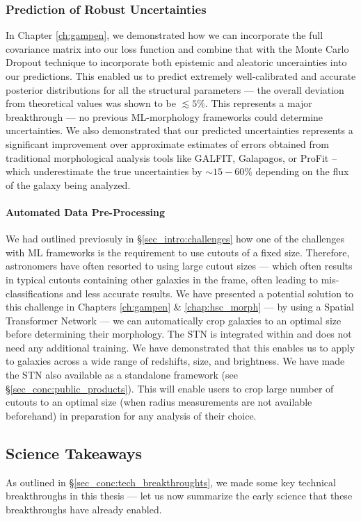 \subsubsection{Prediction of Robust Uncertainties}
In Chapter \ref{ch:gampen}, we demonstrated how we can incorporate the full covariance matrix into our loss function and combine that with the Monte Carlo Dropout technique to incorporate both epistemic and aleatoric uncerainties into our predictions. This enabled us to predict extremely well-calibrated and accurate posterior distributions for all the structural parameters --- the overall deviation from theoretical values was shown to be $\lesssim 5\%$. This represents a major breakthrough --- no previous ML-morphology frameworks could determine uncertainties. We also demonstrated that our predicted uncertainties represents a significant improvement over approximate estimates of errors obtained from traditional morphological analysis tools like GALFIT, Galapagos, or ProFit -- which underestimate the true uncertainties by $\sim15-60\%$ depending on the flux of the galaxy being analyzed. 


\paragraph{Automated Data Pre-Processing} We had outlined previosuly in \S \ref{sec_intro:challenges} how one of the challenges with ML frameworks is the requirement to use cutouts of a fixed size. Therefore, astronomers have often resorted to using large cutout sizes --- which often results in typical cutouts containing other galaxies in the frame, often leading to mis-classifications and less accurate results. We have presented a potential solution to this challenge in Chapters \ref{ch:gampen} \& \ref{chap:hsc_morph} --- by using a Spatial Transformer Network --- we can automatically crop galaxies to an optimal size before determining their morphology. The STN is integrated within \gampen{} and does not need any additional training. We have demonstrated that this enables us to apply \gampen{} to galaxies across a wide range of redshifts, size, and brightness. We have made the STN also available as a standalone framework (see \S \ref{sec_conc:public_products}). This will enable users to crop large number of cutouts to an optimal size (when radius measurements are not available beforehand) in preparation for any analysis of their choice.  

\subsection{Science Takeaways} \label{sec_conc:science_takeaways}
As outlined in \S \ref{sec_conc:tech_breakthroughts}, we made some key technical breakthroughs in this thesis --- let us now summarize the early science that these breakthroughs have already enabled. 

